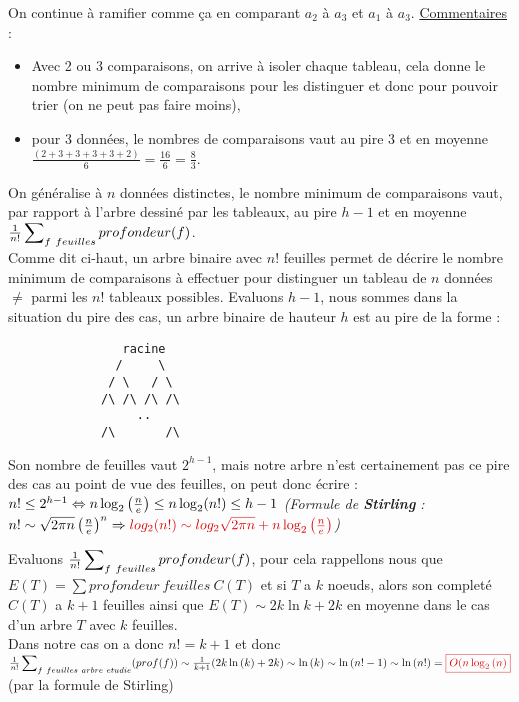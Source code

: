 \documentclass{article}
\newcommand{\red}[1]{\textcolor{darkred}{#1}}
\begin{document}
On continue à ramifier comme ça en comparant $a_2$ à $a_3$ et $a_1$ à $a_3$.
\newpage
\underline{Commentaires} : 
\begin{itemize}
\item Avec 2 ou 3 comparaisons, on arrive à isoler chaque tableau, cela donne le nombre minimum de comparaisons
pour les distinguer et donc pour pouvoir trier (on ne peut pas faire moins),
\item pour 3 données, le nombres de comparaisons vaut au pire $3$ et en moyenne $\frac{(2+3+3+3+3+2)}{6} 
=\frac{16}{6}=\frac{8}{3}$.
\end{itemize}

On généralise à $n$ données distinctes, le nombre minimum de comparaisons vaut, par rapport à l'arbre dessiné par 
les tableaux, au pire $h-1$ et en moyenne $\frac{1}{n!} \sideset{}{_{f\ feuilles}}\sum{profondeur(f)}$. \\
Comme dit ci-haut, un arbre binaire avec $n!$ feuilles permet de décrire le nombre minimum de comparaisons à 
effectuer pour distinguer un tableau de $n$ données $\neq$ parmi les $n!$ tableaux possibles. Evaluons $h-1$, 
nous sommes dans la situation du pire des cas, un arbre binaire de hauteur $h$ est au pire de la forme : \\

\begin{lstlisting}
                racine
               /     \    
              / \   / \   
             /\ /\ /\ /\  
                  ..       
             /\       /\  
\end{lstlisting}

Son nombre de feuilles vaut $2^{h-1}$, mais notre arbre n'est certainement pas ce pire des cas au point de vue 
des feuilles, on peut donc écrire : \\ 
$n!\leq 2^{h-1} \\
\Leftrightarrow n\log_2\left(\frac{n}{e}\right) \leq n\log_2(n!) \leq h-1 \\$
\textit{(Formule de \textbf{Stirling} : $n! \sim \sqrt{2\pi n} \left(\frac{n}{e}\right)^n \Rightarrow 
\red{log_2(n!) \sim log_2{\sqrt{2\pi n}} + n\log_2{\left(\frac{n}{e}\right)}}$)}

\noindent Evaluons $\frac{1}{n!} \sideset{}{_{f\ feuilles}}\sum{profondeur(f)}$, pour cela rappellons nous que
$E(T) = \sum profondeur\ feuilles\ C(T)$ et si $T$ a $k$ noeuds, alors son completé $C(T)$ a $k+1$ feuilles ainsi 
que $E(T) \sim 2k\ln{k}+2k$ en moyenne dans le cas d'un arbre $T$ avec $k$ feuilles.\\
Dans notre cas on a donc $n!=k+1$ et donc $\frac{1}{n!} \sideset{}{_{f\ feuilles\ arbre\ etudie}}\sum(prof(f)) \\
\sim \frac{1}{k+1}(2k\ln{(k)}+2k) \\
\sim \ln{(k)} \\
\sim \ln{(n!-1)} \\
\sim \ln{(n!)} \\
= \red{\boxed{O(n\log_2{(n)}}}$ (par la formule de Stirling) \\
\end{document}
